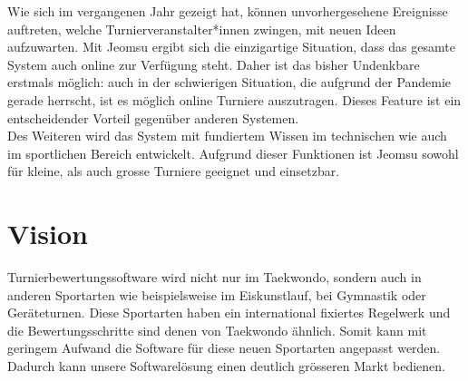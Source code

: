Wie sich im vergangenen Jahr gezeigt hat, können unvorhergesehene Ereignisse auftreten, welche Turnierveranstalter*innen
    zwingen, mit neuen Ideen aufzuwarten.
Mit Jeomsu ergibt sich die einzigartige Situation, dass das gesamte System auch online zur Verfügung steht.
Daher ist das bisher Undenkbare erstmals möglich: auch in der schwierigen Situation, die aufgrund der Pandemie gerade
herrscht, ist es möglich online Turniere auszutragen.
Dieses Feature ist ein entscheidender Vorteil gegenüber anderen Systemen.
\\
Des Weiteren wird das System mit fundiertem Wissen im technischen wie auch im sportlichen Bereich entwickelt.
Aufgrund dieser Funktionen ist Jeomsu sowohl für kleine, als auch grosse Turniere geeignet und einsetzbar.

\section{Vision}
Turnierbewertungssoftware wird nicht nur im Taekwondo, sondern auch in anderen Sportarten wie beispielsweise im Eiskunstlauf,
    bei Gymnastik oder Geräteturnen.
Diese Sportarten haben ein international fixiertes Regelwerk und die Bewertungsschritte sind denen von Taekwondo ähnlich.
Somit kann mit geringem Aufwand die Software für diese neuen Sportarten angepasst werden.
Dadurch kann unsere Softwarelösung einen deutlich grösseren Markt bedienen.

